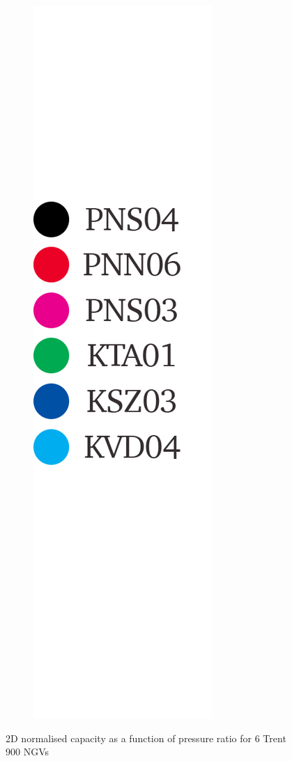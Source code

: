 \documentclass[a4paper, 11pt, oneside]{report}
\begin{document}
\begin{figure}[H]
\begin{subfigure}{.1125\textwidth}
		\includegraphics[width=\linewidth]{figs/t900_2d_capacity_trends_legend.png}
	\end{subfigure}
	\caption{2D normalised capacity as a function of pressure ratio for 6 Trent 900 NGVs}
	\label{fig:t900_2d_capacity_trends}
\end{figure}
\end{document}

